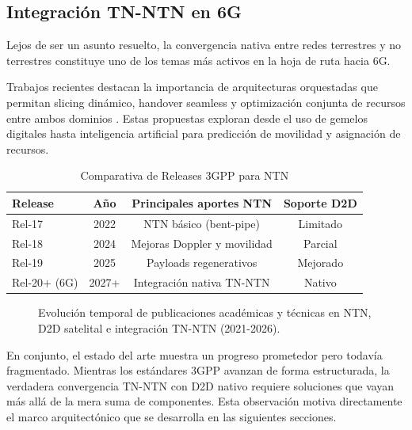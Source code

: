 \subsection{Integración TN-NTN en 6G}

Lejos de ser un asunto resuelto, la convergencia nativa entre redes terrestres y no terrestres constituye uno de los temas más activos en la hoja de ruta hacia 6G. 

Trabajos recientes destacan la importancia de arquitecturas orquestadas que permitan slicing dinámico, handover seamless y optimización conjunta de recursos entre ambos dominios \cite{Wang2025_NTN6G}. Estas propuestas exploran desde el uso de gemelos digitales hasta inteligencia artificial para predicción de movilidad y asignación de recursos.

\begin{table}[t]
\centering
\caption{Comparativa de Releases 3GPP para NTN}
\label{tab:3gpp_releases}
\begin{tabular}{lccc}
\hline
Release & Año & Principales aportes NTN & Soporte D2D \\
\hline
Rel-17 & 2022 & NTN básico (bent-pipe) & Limitado \\
Rel-18 & 2024 & Mejoras Doppler y movilidad & Parcial \\
Rel-19 & 2025 & Payloads regenerativos & Mejorado \\
Rel-20+ (6G) & 2027+ & Integración nativa TN-NTN & Nativo \\
\hline
\end{tabular}
\end{table}

\begin{figure}[t]
\centering
\scalebox{1}{}
\caption{Evolución temporal de publicaciones académicas y técnicas en NTN, D2D satelital e integración TN-NTN (2021-2026).}
\label{fig:publications_evolution}
\end{figure}

En conjunto, el estado del arte muestra un progreso prometedor pero todavía fragmentado. Mientras los estándares 3GPP avanzan de forma estructurada, la verdadera convergencia TN-NTN con D2D nativo requiere soluciones que vayan más allá de la mera suma de componentes. Esta observación motiva directamente el marco arquitectónico que se desarrolla en las siguientes secciones.